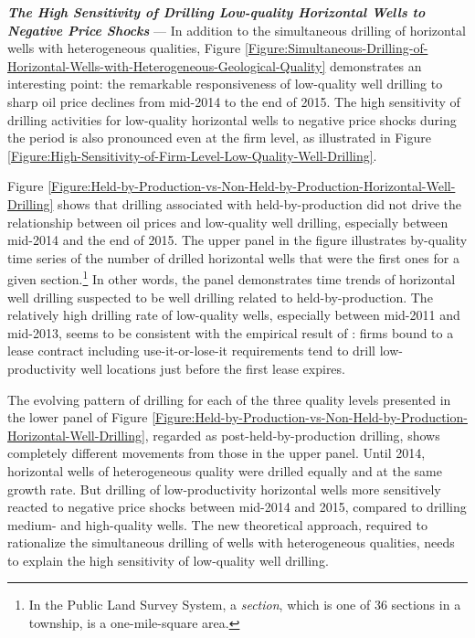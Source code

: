 \par
\vspace{0.3cm}
\noindent
\textit{\textbf{The High Sensitivity of Drilling Low-quality Horizontal Wells to Negative Price Shocks}} --- In addition to the simultaneous drilling of horizontal wells with heterogeneous qualities, Figure \ref{Figure:Simultaneous-Drilling-of-Horizontal-Wells-with-Heterogeneous-Geological-Quality} demonstrates an interesting point: the remarkable responsiveness of low-quality well drilling to sharp oil price declines from mid-2014 to the end of 2015. The high sensitivity of drilling activities for low-quality horizontal wells to negative price shocks during the period is also pronounced even at the firm level, as illustrated in Figure \ref{Figure:High-Sensitivity-of-Firm-Level-Low-Quality-Well-Drilling}. 

Figure \ref{Figure:Held-by-Production-vs-Non-Held-by-Production-Horizontal-Well-Drilling} shows that drilling associated with held-by-production did not drive the relationship between oil prices and low-quality well drilling, especially between mid-2014 and the end of 2015. The upper panel in the figure illustrates by-quality time series of the number of drilled horizontal wells that were the first ones for a given section.\footnote{In the Public Land Survey System, a \textit{section}, which is one of 36 sections in a township, is a one-mile-square area.} In other words, the panel demonstrates time trends of horizontal well drilling suspected to be well drilling related to held-by-production. The relatively high drilling rate of low-quality wells, especially between mid-2011 and mid-2013, seems to be consistent with the empirical result of \cite{The-Economics-of-Time-Limited-Development-Options_2020_Herrnstadt-Kellogg-and-Lewis}: firms bound to a lease contract including use-it-or-lose-it requirements tend to drill low-productivity well locations just before the first lease expires.

The evolving pattern of drilling for each of the three quality levels presented in the lower panel of Figure \ref{Figure:Held-by-Production-vs-Non-Held-by-Production-Horizontal-Well-Drilling}, regarded as post-held-by-production drilling, shows completely different movements from those in the upper panel. Until 2014, horizontal wells of heterogeneous quality were drilled equally and at the same growth rate. But drilling of low-productivity horizontal wells more sensitively reacted to negative price shocks between mid-2014 and 2015, compared to drilling medium- and high-quality wells. The new theoretical approach, required to rationalize the simultaneous drilling of wells with heterogeneous qualities, needs to explain the high sensitivity of low-quality well drilling.
